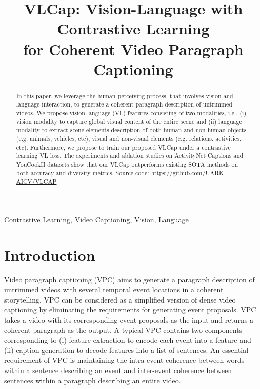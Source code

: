 \documentclass{article}
\title{VLCap: Vision-Language with Contrastive Learning \\ for Coherent Video Paragraph Captioning}
\begin{document}
\maketitle
\begin{abstract}
\vspace{-1mm}
In this paper, we leverage the human perceiving process, that involves vision and language interaction, to generate a coherent paragraph description of untrimmed videos. We propose vision-language (VL) features consisting of two modalities, i.e., (i) vision modality to capture global visual content of the entire scene and (ii) language modality to extract scene elements description of both human and non-human objects (e.g. animals, vehicles, etc), visual and non-visual elements (e.g. relations, activities, etc). Furthermore, we propose to train our proposed VLCap under a contrastive learning VL loss. The experiments and ablation studies on ActivityNet Captions and YouCookII datasets show that our VLCap outperforms existing SOTA methods on both accuracy and diversity metrics. Source code: \url{https://github.com/UARK-AICV/VLCAP}

\end{abstract}
\begin{keywords}
Contrastive Learning, Video Captioning, Vision, Language
\end{keywords}
\vspace{-5mm}
\section{Introduction}
\vspace{-2mm}
\label{sec:intro}
Video paragraph captioning (VPC) aims to generate a paragraph description of untrimmed videos with several temporal event locations in a coherent storytelling. VPC can be considered as a simplified version of dense video captioning by eliminating the requirements for generating event proposals. VPC takes a video with its corresponding event proposals as the input and returns a coherent paragraph as the output. A typical VPC contains two components corresponding to (i) feature extraction to encode each event into a feature and (ii) caption generation to decode features into a list of sentences. An essential requirement of VPC is maintaining the intra-event coherence between words within a sentence describing an event and inter-event coherence between sentences within a paragraph describing an entire video.
\end{document}
